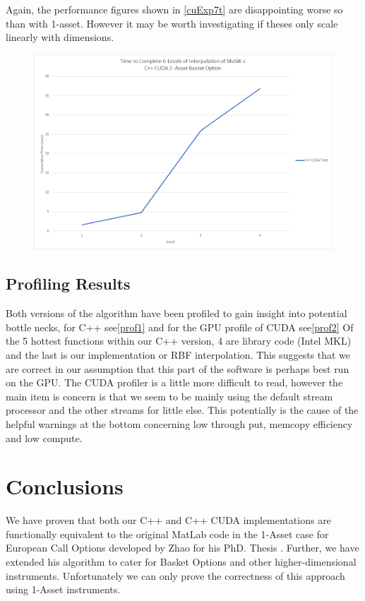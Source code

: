 \documentclass[a4paper]{amsart}
\begin{document}
Again, the performance figures shown in \ref{cuExp7t} are disappointing worse so than with 1-asset. However it may be worth investigating if theses only scale linearly with dimensions.

\begin{figure}[h]
\centering
\includegraphics[scale=0.3]{cuExp7-time.png}
\caption {}
\label {fig:cuExp7t}
\end{figure}

\subsection{Profiling Results}
Both versions of the algorithm have been profiled to gain insight into potential bottle necks, for C++ see\ref{prof1} and for the GPU profile of CUDA see\ref{prof2}
Of the 5 hottest functions within our C++ version, 4 are library code (Intel MKL) and the last is our implementation or RBF interpolation. This suggests that we are correct in our assumption that this part of the software is perhaps best run on the GPU.
The CUDA profiler is a little more difficult to read, however the main item is concern is that we seem to be mainly using the default stream processor and the other streams for little else. This potentially is the cause of the helpful warnings at the bottom concerning low through put, memcopy efficiency and low compute.

\newpage
\section {Conclusions}

We have proven that both our C++ and C++ CUDA implementations are functionally equivalent to the original MatLab code in the 1-Asset case for European Call Options developed by Zhao for his PhD. Thesis \cite{mski0}. Further, we have extended his algorithm to cater for Basket Options and other higher-dimensional instruments. Unfortunately we can only prove the correctness of this approach using 1-Asset instruments. 
\end{document}
